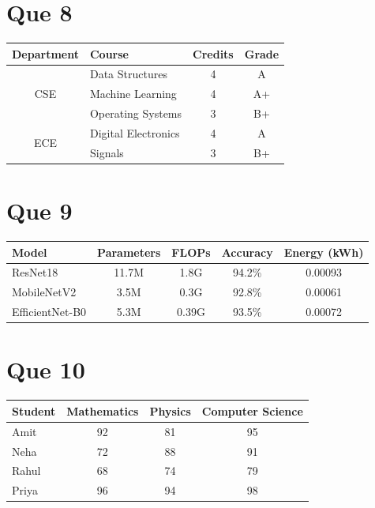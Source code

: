 \documentclass[12pt,a4paper]{article}
\begin{document}
	\section*{Que 8}
	\begin{center}
		\begin{tabular}{|c|l|c|c|}
			\hline
			\textbf{Department} & \textbf{Course} & \textbf{Credits} & \textbf{Grade} \\
			\hline
			\multirow{3}{*}{CSE} & Data Structures    & 4 & A  \\
			& Machine Learning   & 4 & A+ \\
			& Operating Systems  & 3 & B+ \\
			\hline
			\multirow{2}{*}{ECE} & Digital Electronics & 4 & A  \\
			& Signals             & 3 & B+ \\
			\hline
		\end{tabular}
	\end{center}
	
	\section*{Que 9}
	\begin{center}
		\begin{tabular}{|l|c|c|c|c|}
			\hline
			\rowcolor{blue!20}
			\textbf{Model} & \textbf{Parameters} & \textbf{FLOPs} & \textbf{Accuracy} & \textbf{Energy (kWh)} \\
			\hline
			ResNet18        & 11.7M & 1.8G  & 94.2\% & 0.00093 \\
			\hline
			\rowcolor{gray!15}
			MobileNetV2     & 3.5M  & 0.3G  & 92.8\% & 0.00061 \\
			\hline
			EfficientNet-B0 & 5.3M  & 0.39G & 93.5\% & 0.00072 \\
			\hline
		\end{tabular}
	\end{center}
	
	\section*{Que 10}
	\begin{center}
		\begin{tabular}{|l|c|c|c|}
			\hline
			\textbf{Student} & \textbf{Mathematics} & \textbf{Physics} & \textbf{Computer Science} \\
			\hline
			Amit  & \cellcolor{green!40}92 & \cellcolor{yellow!50}81 & \cellcolor{green!40}95 \\
			\hline
			Neha  & \cellcolor{red!40}72   & \cellcolor{yellow!50}88 & \cellcolor{green!40}91 \\
			\hline
			Rahul & \cellcolor{red!40}68   & \cellcolor{red!40}74    & \cellcolor{yellow!50}79 \\
			\hline
			Priya & \cellcolor{green!40}96 & \cellcolor{green!40}94  & \cellcolor{green!40}98 \\
			\hline
		\end{tabular}
	\end{center}
	
\end{document}

